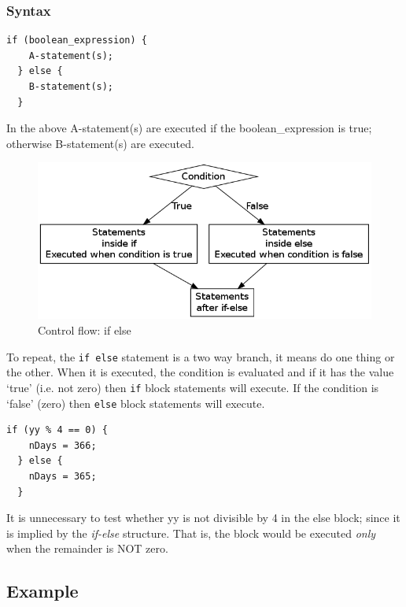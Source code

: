 \documentclass[11pt,a4paper]{article}
\begin{document}
\subsubsection*{Syntax}
\begin{lstlisting}[numbers=none]
  if (boolean_expression) {
    A-statement(s); 
  } else {
    B-statement(s);
  }
\end{lstlisting}

In the above A-statement(s) are executed if the boolean\_expression is true; otherwise B-statement(s) are executed.

\begin{figure}[ht]
\begin{center}
\includegraphics[scale=0.5]{ifelse.png}
\caption{Control flow: if else}
\label{ControlFlow:ifelse}
\end{center}
\end{figure}

To repeat, the \lstinline!if else! statement is a two way branch, it means do one thing or the other. When it is executed, the condition is evaluated and if it has the value `true' (i.e. not zero) then \lstinline!if! block statements will execute. If the condition is `false' (zero) then \lstinline!else! block statements will execute. 

\begin{lstlisting}[numbers=none]
  if (yy % 4 == 0) {
    nDays = 366;
  } else {
    nDays = 365;
  }
\end{lstlisting}

It is unnecessary to test whether yy is not divisible by 4 in the else block; since it is implied by the \emph{if-else} structure. That is, the block would be executed \emph{only} when the remainder is  NOT zero.

\subsection*{Example}
\end{document}
